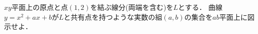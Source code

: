 \documentclass[../../main.tex]{subfiles}
\begin{document}
$xy$平面上の原点と点$(1,2)$を結ぶ線分(両端を含む)を$L$とする．
曲線$y=x^2+ax+b$が$L$と共有点を持つような実数の組$(a,b)$の集合を$ab$平面上に図示せよ．
\end{document}
